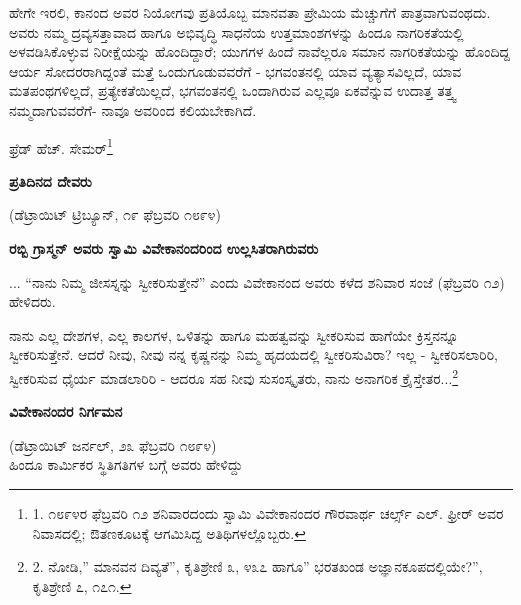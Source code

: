 ಹೇಗೇ ಇರಲಿ, ಕಾನಂದ ಅವರ ನಿಯೋಗವು ಪ್ರತಿಯೊಬ್ಬ ಮಾನವತಾ ಪ್ರೇಮಿಯ ಮೆಚ್ಚುಗೆಗೆ ಪಾತ್ರವಾಗುವಂಥದು. ಅವರು ನಮ್ಮ ದ್ರವ್ಯಸತ್ತಾವಾದ ಹಾಗೂ ಅಭಿವೃದ್ಧಿ ಸಾಧನೆಯ ಉತ್ತಮಾಂಶಗಳನ್ನು ಹಿಂದೂ ನಾಗರಿಕತೆಯಲ್ಲಿ ಅಳವಡಿಸಿಕೊಳ್ಳುವ ನಿರೀಕ್ಷೆಯನ್ನು ಹೊಂದಿದ್ದಾರೆ; ಯುಗಗಳ ಹಿಂದೆ ನಾವೆಲ್ಲರೂ ಸಮಾನ ನಾಗರಿಕತೆಯನ್ನು ಹೊಂದಿದ್ದ ಆರ್ಯ ಸೋದರರಾಗಿದ್ದಂತೆ ಮತ್ತೆ ಒಂದುಗೂಡುವವರೆಗೆ - ಭಗವಂತನಲ್ಲಿ ಯಾವ ವ್ಯತ್ಯಾಸವಿಲ್ಲದೆ, ಯಾವ ಮತಪಂಥಗಳಿಲ್ಲದೆ, ಪ್ರತ್ಯೇಕತೆಯಿಲ್ಲದೆ, ಭಗವಂತನಲ್ಲಿ ಒಂದಾಗಿರುವ ಎಲ್ಲವೂ ಏಕವೆನ್ನುವ ಉದಾತ್ತ ತತ್ತ್ವ ನಮ್ಮದಾಗುವವರೆಗೆ- ನಾವೂ ಅವರಿಂದ ಕಲಿಯಬೇಕಾಗಿದೆ.

\begin{flushright}
ಫ್ರೆಡ್ ಹೆಚ್. ಸೇಮರ್\footnote{1. ೧೮೯೪ರ ಫೆಬ್ರವರಿ ೧೨ ಶನಿವಾರದಂದು ಸ್ವಾಮಿ ವಿವೇಕಾನಂದರ ಗೌರವಾರ್ಥ ಚರ್ಲ್ಸ್ ಎಲ್. ಫ್ರೀರ್ ಅವರ ನಿವಾಸದಲ್ಲಿ; ಔತಣಕೂಟಕ್ಕೆ ಆಗಮಿಸಿದ್ದ ಅತಿಥಿಗಳಲ್ಲೊಬ್ಬರು.}
\end{flushright}

\begin{center}
\textbf{ಪ್ರತಿದಿನದ ದೇವರು}
\end{center}

\begin{center}
(ಡೆಟ್ರಾಯಿಟ್ ಟ್ರಿಬ್ಯೂನ್, ೧೯ ಫೆಬ್ರವರಿ ೧೮೯೪)
\end{center}

\begin{center}
\textbf{ರಬ್ಬಿ ಗ್ರಾಸ್ಮನ್ ಅವರು ಸ್ವಾಮಿ ವಿವೇಕಾನಂದರಿಂದ ಉಲ್ಲಸಿತರಾಗಿರುವರು}
\end{center}

... “ನಾನು ನಿಮ್ಮ ಜೀಸಸ್ನನ್ನು ಸ್ವೀಕರಿಸುತ್ತೇನೆ” ಎಂದು ವಿವೇಕಾನಂದ ಅವರು ಕಳೆದ ಶನಿವಾರ ಸಂಜೆ (ಫೆಬ್ರವರಿ ೧೨) ಹೇಳಿದರು.

ನಾನು ಎಲ್ಲ ದೇಶಗಳ, ಎಲ್ಲ ಕಾಲಗಳ, ಒಳಿತನ್ನು ಹಾಗೂ ಮಹತ್ವವನ್ನು ಸ್ವೀಕರಿಸುವ ಹಾಗೆಯೇ ಕ್ರಿಸ್ತನನ್ನೂ ಸ್ವೀಕರಿಸುತ್ತೇನೆ. ಆದರೆ ನೀವು, ನೀವು ನನ್ನ ಕೃಷ್ಣನನ್ನು ನಿಮ್ಮ ಹೃದಯದಲ್ಲಿ ಸ್ವೀಕರಿಸುವಿರಾ? ಇಲ್ಲ - ಸ್ವೀಕರಿಸಲಾರಿರಿ, ಸ್ವೀಕರಿಸುವ ಧೈರ್ಯ ಮಾಡಲಾರಿರಿ - ಆದರೂ ಸಹ ನೀವು ಸುಸಂಸ್ಕೃತರು, ನಾನು ಅನಾಗರಿಕ ಕ್ರೈಸ್ತೇತರ...\footnote{2. ನೋಡಿ,” ಮಾನವನ ದಿವ್ಯತೆ”, ಕೃತಿಶ್ರೇಣಿ ೩, ೪೩೭ ಹಾಗೂ” ಭರತಖಂಡ ಅಜ್ಞಾನಕೂಪದಲ್ಲಿಯೇ?”, ಕೃತಿಶ್ರೇಣಿ ೭, ೧೭೧.}

\begin{center}
\textbf{ವಿವೇಕಾನಂದರ ನಿರ್ಗಮನ}
\end{center}

\begin{center}
(ಡೆಟ್ರಾಯಿಟ್ ಜರ್ನಲ್, ೨೩ ಫೆಬ್ರವರಿ ೧೮೯೪)\\ಹಿಂದೂ ಕಾರ್ಮಿಕರ ಸ್ಥಿತಿಗತಿಗಳ ಬಗ್ಗೆ ಅವರು ಹೇಳಿದ್ದು
\end{center}

